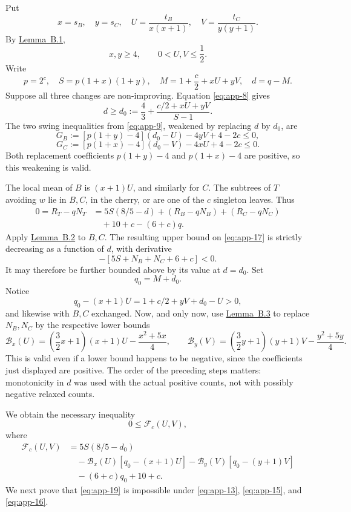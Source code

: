 \documentclass[11pt,letterpaper]{article}
\theoremstyle{plain}
\begin{document}
Put \[
x=s_B,\quad y=s_C,\quad
U=\frac{t_B}{x(x+1)},\quad V=\frac{t_C}{y(y+1)}.
\] By \hyperref[lem:app-1]{Lemma~B.1}, \[
x,y\ge4,\qquad 0<U,V\le\frac12.
\tag{B.13}\label{eq:app-13}
\] Write \[
p=2^c,\quad S=p(1+x)(1+y),\quad
M=1+\frac c2+xU+yV,\quad d=q-M.
\] Suppose all three changes are non-improving. Equation \eqref{eq:app-8} gives \[
d\ge d_0:=\frac43+\frac{c/2+xU+yV}{S-1}.
\tag{B.14}\label{eq:app-14}
\] The two swing inequalities from \eqref{eq:app-9}, weakened by replacing \(d\) by \(d_0\), are \[
G_B:=[p(1+y)-4](d_0-U)-4yV+4-2c\le0,
\tag{B.15}\label{eq:app-15}
\] \[
G_C:=[p(1+x)-4](d_0-V)-4xU+4-2c\le0.
\tag{B.16}\label{eq:app-16}
\] Both replacement coefficients \(p(1+y)-4\) and \(p(1+x)-4\) are positive, so this weakening is valid.

The local mean of \(B\) is \((x+1)U\), and similarly for \(C\). The subtrees of \(T\) avoiding \(w\) lie in \(B,C\), in the cherry, or are one of the \(c\) singleton leaves. Thus \[
\begin{aligned}
0=R_T-qN_T
&=5S(8/5-d)+(R_B-qN_B)+(R_C-qN_C)\\
&\quad+10+c-(6+c)q.
\end{aligned}
\tag{B.17}\label{eq:app-17}
\] Apply \hyperref[lem:app-2]{Lemma~B.2} to \(B,C\). The resulting upper bound on \eqref{eq:app-17} is strictly decreasing as a function of \(d\), with derivative \[
-[5S+N_B+N_C+6+c]<0.
\] It may therefore be further bounded above by its value at \(d=d_0\). Set \[
q_0=M+d_0.
\] Notice \[
q_0-(x+1)U=1+c/2+yV+d_0-U>0,
\] and likewise with \(B,C\) exchanged. Now, and only now, use \hyperref[lem:app-3]{Lemma~B.3} to replace \(N_B,N_C\) by the respective lower bounds \[
\mathcal B_x(U)=\left(\frac32x+1\right)(x+1)U-\frac{x^2+5x}{4},
\qquad
\mathcal B_y(V)=\left(\frac32y+1\right)(y+1)V-\frac{y^2+5y}{4}.
\tag{B.18}\label{eq:app-18}
\] This is valid even if a lower bound happens to be negative, since the coefficients just displayed are positive. The order of the preceding steps matters: monotonicity in \(d\) was used with the actual positive counts, not with possibly negative relaxed counts.

We obtain the necessary inequality \[
\boxed{0\le\mathcal F_c(U,V),}
\tag{B.19}\label{eq:app-19}
\] where \[
\begin{aligned}
\mathcal F_c(U,V)
&=5S(8/5-d_0)\\
&\quad-\mathcal B_x(U)[q_0-(x+1)U]
      -\mathcal B_y(V)[q_0-(y+1)V]\\
&\quad-(6+c)q_0+10+c.
\end{aligned}
\tag{B.20}\label{eq:app-20}
\] We next prove that \eqref{eq:app-19} is impossible under \eqref{eq:app-13}, \eqref{eq:app-15}, and \eqref{eq:app-16}.
\end{document}
